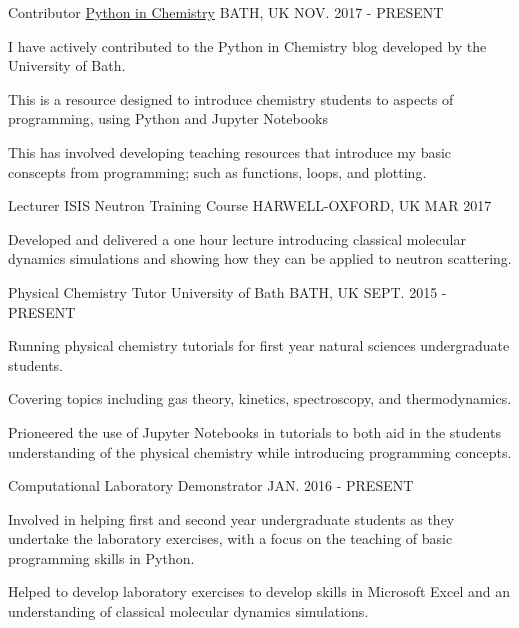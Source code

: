 \begin{cventries}
  \cventry
	{Contributor}
	{\href{http://blogs.bath.ac.uk/python/}{Python in Chemistry}}
	{BATH, UK}
	{NOV. 2017 - PRESENT}
	{
		\begin{cvitems}
		   \item {I have actively contributed to the Python in Chemistry blog developed by the University of Bath.}
		   \item {This is a resource designed to introduce chemistry students to aspects of programming, using Python and Jupyter Notebooks}
		   \item {This has involved developing teaching resources that introduce my basic conscepts from programming; such as functions, loops, and plotting.}
		\end{cvitems}
	}
  \cventry
  	{Lecturer}
    {ISIS Neutron Training Course}
    {HARWELL-OXFORD, UK}
    {MAR 2017}
    {
       \begin{cvitems}
		\item {Developed and delivered a one hour lecture introducing classical molecular dynamics simulations and showing how they can be applied to neutron scattering.}
        \end{cvitems}
    }
  \cventry
    {Physical Chemistry Tutor}
    {University of Bath}
    {BATH, UK}
    {SEPT. 2015 - PRESENT}
    {
      \begin{cvitems}
        \item {Running physical chemistry tutorials for first year natural sciences undergraduate students.}
        \item {Covering topics including gas theory, kinetics, spectroscopy, and thermodynamics.}
        \item {Prioneered the use of Jupyter Notebooks in tutorials to both aid in the students understanding of the physical chemistry while introducing programming concepts.}
      \end{cvitems}
    }
  \cventry
 	{Computational Laboratory Demonstrator}
    {}
    {}
    {JAN. 2016 - PRESENT}
    {
    	\begin{cvitems}
        	\item {Involved in helping first and second year undergraduate students as they undertake the laboratory exercises, with a focus on the teaching of basic programming skills in Python.}
            \item {Helped to develop laboratory exercises to develop skills in Microsoft Excel and an understanding of classical molecular dynamics simulations.}
        \end{cvitems}
    }
\end{cventries}


